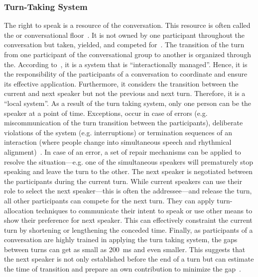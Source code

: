 \subsubsection{Turn-Taking System}\label{sec.rw.hi.tt}

The right to speak is a resource of the \gls{conversation}.
This resource is often called the or \gls{conversational floor}~\cite[]{Hayashi1988a}.
It is not owned by one participant throughout the \gls{conversation} but taken, yielded, and competed for~\cite[]{Sacks1978}.
The transition of the \gls{turn} from one participant of the \gls{conversational group} to another is organized through the.
According to~, it is a system that is \enquote{interactionally managed}.
Hence, it is the responsibility of the participants of a \gls{conversation} to coordinate and ensure its effective application.
Furthermore, it considers the transition between the current and next \gls{speaker} but not the previous and next \gls{turn}.
Therefore, it is a \enquote{local system}.
As a result of the \gls{turn taking system}, only one person can be the \gls{speaker} at a point of time.
Exceptions, occur in case of errors (e.g. miscommunication of the \gls{turn} transition between the participants), deliberate violations of the system (e.g. interruptions) or termination sequences of an interaction (where people change into simultaneous speech and rhythmical alignment)~\cite[p. 3]{Auer}.
In case of an error, a set of repair mechanisms can be applied to resolve the situation---e.g. one of the simultaneous \glspl{speaker} will prematurely stop speaking and leave the \gls{turn} to the other.
The next \gls{speaker} is negotiated between the participants during the current \gls{turn}.
While current \glspl{speaker} can use their role to select the next \gls{speaker}---this is often the \gls{addressee}---and release the \gls{turn}, all other participants can compete for the next \gls{turn}.
They can apply \gls{turn}-allocation techniques to communicate their intent to speak or use other means to show their preference for next \gls{speaker}.
This can effectively constraint the current \gls{turn} by shortening or lengthening the conceded time.
Finally, as participants of a \gls{conversation} are highly trained in applying the \gls{turn taking system}, the gaps between \glspl{turn} can get as small as \SI{200}{\ms} and even smaller.
This suggests that the next \gls{speaker} is not only established before the end of a \gls{turn} but can estimate the time of transition and prepare an own contribution to minimize the gap~\cite[]{Heldner2010}.

